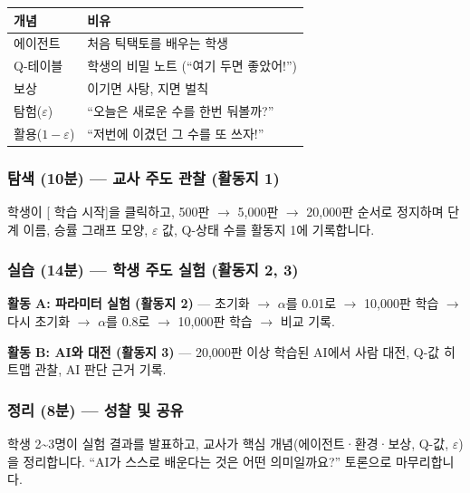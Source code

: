 \documentclass[11pt,a4paper]{article}
\begin{document}
\begin{center}
\renewcommand{\arraystretch}{1.4}
\begin{tabular}{|l|l|}
\hline
\rowcolor{tableheader}
\textbf{개념} & \textbf{비유} \\
\hline
에이전트 & 처음 틱택토를 배우는 학생 \\
\hline
Q-테이블 & 학생의 비밀 노트 (``여기 두면 좋았어!'') \\
\hline
보상 & 이기면 사탕, 지면 벌칙 \\
\hline
탐험($\varepsilon$) & ``오늘은 새로운 수를 한번 둬볼까?'' \\
\hline
활용($1-\varepsilon$) & ``저번에 이겼던 그 수를 또 쓰자!'' \\
\hline
\end{tabular}
\end{center}

\subsubsection{ 탐색 (10분) — 교사 주도 관찰 (활동지 1)}

학생이 [ 학습 시작]을 클릭하고, 500판 $\to$ 5,000판 $\to$ 20,000판 순서로 정지하며 단계 이름, 승률 그래프 모양, $\varepsilon$ 값, Q-상태 수를 활동지 1에 기록합니다.

\subsubsection{ 실습 (14분) — 학생 주도 실험 (활동지 2, 3)}

\textbf{활동 A: 파라미터 실험 (활동지 2)} — 초기화 $\to$ $\alpha$를 0.01로 $\to$ 10,000판 학습 $\to$ 다시 초기화 $\to$ $\alpha$를 0.8로 $\to$ 10,000판 학습 $\to$ 비교 기록.

\textbf{활동 B: AI와 대전 (활동지 3)} — 20,000판 이상 학습된 AI에서 사람 대전, Q-값 히트맵 관찰, AI 판단 근거 기록.

\subsubsection{ 정리 (8분) — 성찰 및 공유}

학생 2\textasciitilde3명이 실험 결과를 발표하고, 교사가 핵심 개념(에이전트·환경·보상, Q-값, $\varepsilon$)을 정리합니다. ``AI가 스스로 배운다는 것은 어떤 의미일까요?'' 토론으로 마무리합니다.

\end{document}
